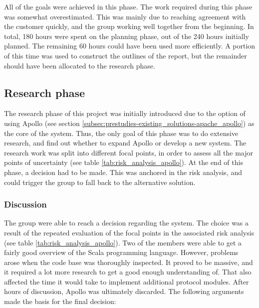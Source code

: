 All of the goals were achieved in this phase. The work required during this phase was somewhat overestimated. This was mainly due to reaching agreement with the customer quickly, and the group working well together from the beginning. In total, 180 hours were spent on the planning phase, out of the 240 hours initially planned. The remaining 60 hours could have been used more efficiently. A portion of this time was used to construct the outlines of the report, but the remainder should have been allocated to the research phase. 

\subsection{Research phase}
\label{subsec:project_lifecycle-planning_and_research-research_phase}

The research phase of this project was initially introduced due to the option of using Apollo (see section \ref{subsec:prestudies-existing_solutions-apache_apollo}) as the core of the system. Thus, the only goal of this phase was to do extensive research, and find out whether to expand Apollo or develop a new system. The research work was split into different focal points, in order to assess all the major points of uncertainty (see table \ref{tab:risk_analysis_apollo}). At the end of this phase, a decision had to be made. This was anchored in the risk analysis, and could trigger the group to fall back to the alternative solution.

\subsubsection{Discussion}
\label{subsec:project_lifecycle-planning_and_research-research_phase-discussion}

The group were able to reach a decision regarding the system. The choice was a result of the repeated evaluation of the focal points in the associated risk analysis (see table \ref{tab:risk_analysis_apollo}). Two of the members were able to get a fairly good overview of the Scala programming language. However, problems arose when the code base was thoroughly inspected. It proved to be massive, and it required a lot more research to get a good enough understanding of. That also affected the time it would take to implement additional protocol modules. After hours of discussion, Apollo was ultimately discarded. The following arguments made the basis for the final decision:

